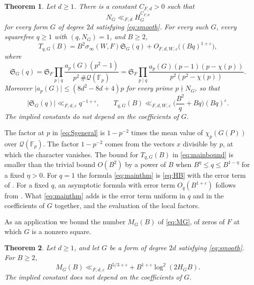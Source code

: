 \documentclass[11pt]{amsart}
\numberwithin{equation}{section}
\numberwithin{figure}{section}
\newtheorem{theorem}{Theorem}[section]
\theoremstyle{definition}
\renewcommand{\S}{\mathfrak{S}}
\newcommand{\eps}{\varepsilon}
\newcommand{\abs}[1]{\lvert #1\rvert}
\newcommand{\Fp}{\mathbb F_p}
\newcommand{\Qc}{\mathcal Q}
\begin{document}
\begin{theorem}\label{thm:polynomial}
Let $d\ge1$. There is a constant $C_{F,d}>0$ such that
\begin{equation}\label{eq:badheight}
 N_G\ll_{F,d}H_G^{C_{F,d}}
\end{equation}
for every form $G$ of degree $2d$ satisfying \eqref{eq:smooth}. For
every such $G$, every squarefree $q\ge1$ with $(q,N_G)=1$, and
$B\ge2$,
\begin{equation}\label{eq:mainthm}
 T_{q,G}(B)=B^2\sigma_\infty(W,F)\S_G(q)
 +O_{F,d,W,\eps}\big((Bq)^{1+\eps}\big),
\end{equation}
where
\begin{equation}\label{eq:Sgeneral}
 \S_G(q)=\S_F\prod_{p\mid q}\frac{a_p(G)(p^2-1)}{p^2\,\#\Qc(\Fp)}
 =\S_F\prod_{p\mid q}\frac{a_p(G)(p-1)(p-\chi(p))}{p^2(p^2-\chi(p))}.
\end{equation}
Moreover $\abs{a_p(G)}\le(8d^2-8d+4)p$ for every prime $p\nmid N_G$,
so that
\begin{equation}\label{eq:mainbound}
 \abs{\S_G(q)}\ll_{F,d,\eps}q^{-1+\eps},
 \qquad
 T_{q,G}(B)\ll_{F,d,W,\eps}\Big(\frac{B^2}q+Bq\Big)(Bq)^\eps.
\end{equation}
The implied constants do not depend on the coefficients of $G$.
\end{theorem}

The factor at $p$ in \eqref{eq:Sgeneral} is $1-p^{-2}$ times the mean
value of $\chi_p(G(P))$ over $\Qc(\Fp)$. The factor $1-p^{-2}$ comes
from the vectors $x$ divisible by $p$, at which the character
vanishes. The bound for $T_{q,G}(B)$ in \eqref{eq:mainbound} is
smaller than the trivial bound $O(B^2)$ by a power of $B$ when
$B^\eta\le q\le B^{1-\eta}$ for a fixed $\eta>0$. For $q=1$ the
formula \eqref{eq:mainthm} is \eqref{eq:HB} with the error term of
\cite[Theorem~1.1]{G}. For a fixed $q$, an asymptotic formula with
error term $O_q(B^{1+\eps})$ follows from \cite[Theorem~3.3]{G}. What
\eqref{eq:mainthm} adds is the error term uniform in $q$ and in the
coefficients of $G$ together, and the evaluation of the local
factors.

As an application we bound the number $M_G(B)$ of \eqref{eq:MG}, of
zeros of $F$ at which $G$ is a nonzero square.

\begin{theorem}\label{thm:uniformcount}
Let $d\ge1$, and let $G$ be a form of degree $2d$ satisfying
\eqref{eq:smooth}. For $B\ge2$,
\begin{equation}\label{eq:uniformcount}
 M_G(B)\ll_{F,d,\eps}B^{5/3+\eps}+B^{1+\eps}\log^2(2H_GB).
\end{equation}
The implied constant does not depend on the coefficients of $G$.
\end{theorem}
\end{document}
